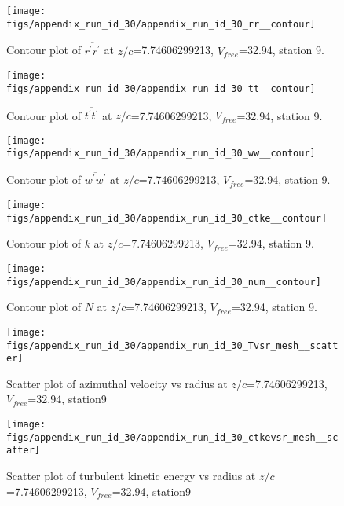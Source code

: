 \begin{figure}[H]
\centering
\texttt{[image: figs/appendix\_run\_id\_30/appendix\_run\_id\_30\_rr\_\_contour]}
\caption{Contour plot of $\overline{r^\prime r^\prime}$ at $z/c$=7.74606299213, $V_{free}$=32.94, station 9.}
\label{fig:appendix_run_id_30_rr__contour}
\end{figure}


\begin{figure}[H]
\centering
\texttt{[image: figs/appendix\_run\_id\_30/appendix\_run\_id\_30\_tt\_\_contour]}
\caption{Contour plot of $\overline{t^\prime t^\prime}$ at $z/c$=7.74606299213, $V_{free}$=32.94, station 9.}
\label{fig:appendix_run_id_30_tt__contour}
\end{figure}


\begin{figure}[H]
\centering
\texttt{[image: figs/appendix\_run\_id\_30/appendix\_run\_id\_30\_ww\_\_contour]}
\caption{Contour plot of $\overline{w^\prime w^\prime}$ at $z/c$=7.74606299213, $V_{free}$=32.94, station 9.}
\label{fig:appendix_run_id_30_ww__contour}
\end{figure}


\begin{figure}[H]
\centering
\texttt{[image: figs/appendix\_run\_id\_30/appendix\_run\_id\_30\_ctke\_\_contour]}
\caption{Contour plot of $k$ at $z/c$=7.74606299213, $V_{free}$=32.94, station 9.}
\label{fig:appendix_run_id_30_ctke__contour}
\end{figure}


\begin{figure}[H]
\centering
\texttt{[image: figs/appendix\_run\_id\_30/appendix\_run\_id\_30\_num\_\_contour]}
\caption{Contour plot of $N$ at $z/c$=7.74606299213, $V_{free}$=32.94, station 9.}
\label{fig:appendix_run_id_30_num__contour}
\end{figure}


\begin{figure}[H]
\centering
\texttt{[image: figs/appendix\_run\_id\_30/appendix\_run\_id\_30\_Tvsr\_mesh\_\_scatter]}
\caption{Scatter plot of azimuthal velocity vs radius at $z/c$=7.74606299213, $V_{free}$=32.94, station9}
\label{fig:appendix_run_id_30_Tvsr_mesh__scatter}
\end{figure}


\begin{figure}[H]
\centering
\texttt{[image: figs/appendix\_run\_id\_30/appendix\_run\_id\_30\_ctkevsr\_mesh\_\_scatter]}
\caption{Scatter plot of turbulent kinetic energy vs radius at $z/c$=7.74606299213, $V_{free}$=32.94, station9}
\label{fig:appendix_run_id_30_ctkevsr_mesh__scatter}
\end{figure}


